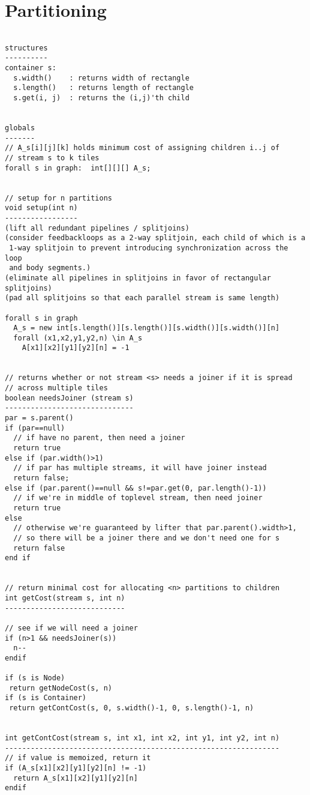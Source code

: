 \section{Partitioning}

\scriptsize
\begin{verbatim}

structures
----------
container s:
  s.width()    : returns width of rectangle
  s.length()   : returns length of rectangle
  s.get(i, j)  : returns the (i,j)'th child


globals
-------
// A_s[i][j][k] holds minimum cost of assigning children i..j of
// stream s to k tiles
forall s in graph:  int[][][] A_s;


// setup for n partitions
void setup(int n) 
-----------------
(lift all redundant pipelines / splitjoins)
(consider feedbackloops as a 2-way splitjoin, each child of which is a
 1-way splitjoin to prevent introducing synchronization across the loop
 and body segments.)
(eliminate all pipelines in splitjoins in favor of rectangular splitjoins)
(pad all splitjoins so that each parallel stream is same length)

forall s in graph
  A_s = new int[s.length()][s.length()][s.width()][s.width()][n]
  forall (x1,x2,y1,y2,n) \in A_s
    A[x1][x2][y1][y2][n] = -1


// returns whether or not stream <s> needs a joiner if it is spread
// across multiple tiles
boolean needsJoiner (stream s)
------------------------------
par = s.parent()
if (par==null)
  // if have no parent, then need a joiner
  return true
else if (par.width()>1)
  // if par has multiple streams, it will have joiner instead
  return false;
else if (par.parent()==null && s!=par.get(0, par.length()-1))
  // if we're in middle of toplevel stream, then need joiner
  return true
else
  // otherwise we're guaranteed by lifter that par.parent().width>1,
  // so there will be a joiner there and we don't need one for s
  return false
end if


// return minimal cost for allocating <n> partitions to children
int getCost(stream s, int n)
----------------------------

// see if we will need a joiner
if (n>1 && needsJoiner(s)) 
  n--
endif

if (s is Node)
 return getNodeCost(s, n)
if (s is Container)
 return getContCost(s, 0, s.width()-1, 0, s.length()-1, n)


int getContCost(stream s, int x1, int x2, int y1, int y2, int n)
----------------------------------------------------------------
// if value is memoized, return it
if (A_s[x1][x2][y1][y2][n] != -1)
  return A_s[x1][x2][y1][y2][n]
endif


\end{verbatim}

